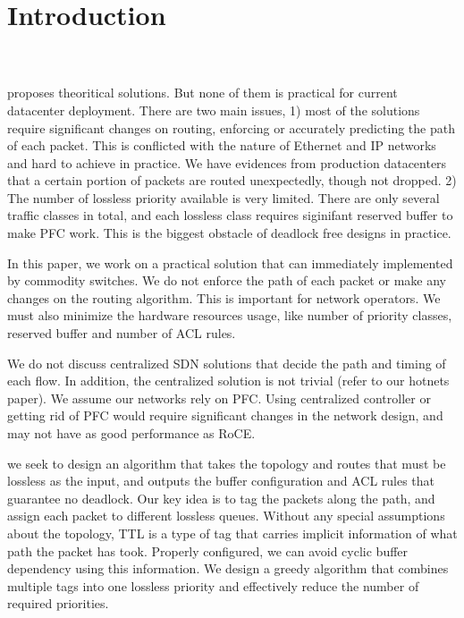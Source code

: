 \section{Introduction}\label{sec:intro}

 \\ 

 \\

 proposes theoritical solutions. But none of them is practical for current datacenter deployment.
There are two main issues, 1) most of the solutions require significant changes on routing, enforcing or accurately predicting
the path of each packet. This is conflicted with the nature of Ethernet and IP networks and hard to achieve in practice.
We have evidences from production datacenters that a certain portion of packets are routed unexpectedly, though not dropped.
2) The number of lossless priority available is very limited. There are only several traffic classes in total,
and each lossless class requires siginifant reserved buffer to make PFC work. This is the biggest obstacle of 
deadlock free designs in practice.

 In this paper, we work on a practical solution that can immediately implemented by 
commodity switches. We do not enforce the path of each packet or make any changes on the routing algorithm. 
This is important for network operators. We must also minimize the hardware resources usage, like number of priority
classes, reserved buffer and number of ACL rules. 

 We do not discuss centralized SDN solutions that decide the path and timing of each flow. In 
addition, the centralized solution is not trivial (refer
to our hotnets paper). We assume our networks rely on PFC. Using centralized controller or getting rid of PFC would require 
significant changes in the network design, and may not have as good performance as RoCE.

 we seek to design an algorithm that takes the topology and routes that must be lossless as the 
input, and outputs the buffer configuration and ACL rules that guarantee no deadlock. Our key idea is to tag the packets along 
the path, and assign each packet to different lossless queues. Without any special assumptions about the topology, 
TTL is a type of tag that carries implicit information of what path the packet has took.
Properly configured, we can avoid cyclic buffer dependency using this information.
We design a greedy algorithm that combines multiple tags into one lossless priority and effectively reduce the number of 
required priorities.

